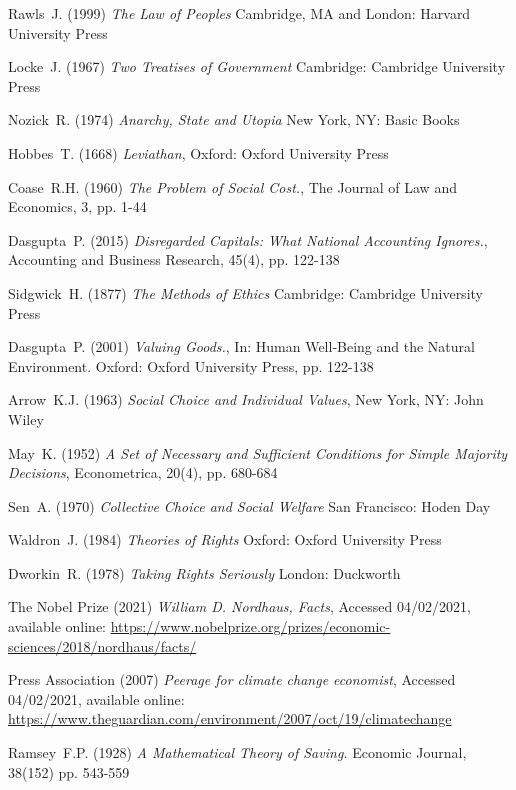 \documentclass[11pt, oneside]{article}   	%
\begin{document}
\begin{thebibliography}{99}

 Rawls~J. (1999)
\emph{The Law of Peoples}
Cambridge, MA and London: Harvard University Press

 Locke~J. (1967)
\emph{Two Treatises of Government}
Cambridge: Cambridge University Press
	
 Nozick~R. (1974)
\emph{Anarchy, State and Utopia}
New York, NY: Basic Books
	
 Hobbes~T. (1668)
\emph{Leviathan},
Oxford: Oxford University Press

 Coase~R.H. (1960)
\emph{The Problem of Social Cost.},
The Journal of Law and Economics, 3, pp. 1-44

 Dasgupta~P. (2015)
\emph{Disregarded Capitals: What National Accounting Ignores.},
Accounting and Business Research, 45(4), pp. 122-138

 Sidgwick~H. (1877)
\emph{The Methods of Ethics}
Cambridge: Cambridge University Press

 Dasgupta~P. (2001)
\emph{Valuing Goods.},
In: Human Well-Being and the Natural Environment. Oxford: Oxford University Press, pp. 122-138

 Arrow~K.J. (1963)
\emph{Social Choice and Individual Values},
New York, NY: John Wiley
	
 May~K. (1952)
\emph{A Set of Necessary and Sufficient Conditions for Simple Majority Decisions},
Econometrica, 20(4), pp. 680-684

 Sen~A. (1970)
\emph{Collective Choice and Social Welfare}
San Francisco: Hoden Day

 Waldron~J. (1984)
\emph{Theories of Rights}
Oxford: Oxford University Press
		
 Dworkin~R. (1978)
\emph{Taking Rights Seriously}
London: Duckworth

 The Nobel Prize (2021)
\emph{William D. Nordhaus, Facts},
Accessed 04/02/2021, available online: 
\url{https://www.nobelprize.org/prizes/economic-sciences/2018/nordhaus/facts/}

 Press Association (2007)
\emph{Peerage for climate change economist},
Accessed 04/02/2021, available online: 
\url{https://www.theguardian.com/environment/2007/oct/19/climatechange}

 Ramsey~F.P. (1928)
\emph{A Mathematical Theory of Saving.}
Economic Journal, 38(152) pp. 543-559


\end{thebibliography}
\end{document}
